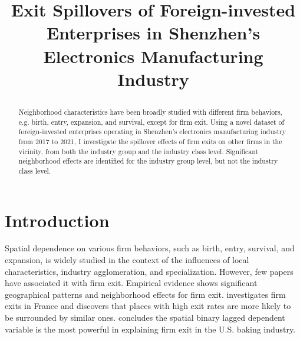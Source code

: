 
\title{Exit Spillovers of Foreign-invested Enterprises in Shenzhen's Electronics Manufacturing Industry
 
}
\maketitle

\begin{abstract}
Neighborhood characteristics have been broadly studied with different firm behaviors, e.g. birth, entry, expansion, and survival, except for firm exit. Using a novel dataset of foreign-invested enterprises operating in Shenzhen's electronics manufacturing industry from 2017 to 2021, I investigate the spillover effects of firm exits on other firms in the vicinity, from both the industry group and the industry class level. Significant neighborhood effects are identified for the industry group level, but not the industry class level.
\end{abstract}


\section{Introduction}

Spatial dependence on various firm behaviors, such as birth, entry, survival, and expansion, is widely studied in the context of the influences of local characteristics, industry agglomeration, and specialization. However, few papers have associated it with firm exit. Empirical evidence shows significant geographical patterns and neighborhood effects for firm exit. \cite{arcuri2019spatial} investigates firm exits in France and discovers that places with high exit rates are more likely to be surrounded by similar ones. \cite{sarmiento2007spatially} concludes the spatial binary lagged dependent variable is the most powerful in explaining firm exit in the U.S. baking industry.

